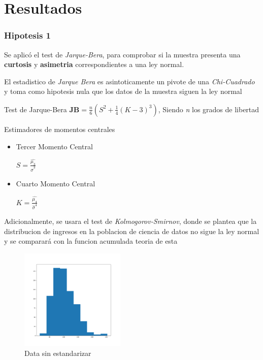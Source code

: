 \documentclass{beamer}
\begin{document}
\section{Resultados}
\begin{frame}
\frametitle{Hipotesis 1}
  Se aplicó el test de \textit{Jarque-Bera}, para comprobar si la muestra
  presenta una \textbf{curtosis} y \textbf{asimetria} correspondientes
  a una ley normal.

  El estadistico de \textit{Jarque Bera} es asintoticamente un pivote de
  una \textit{Chi-Cuadrado} y toma como hipotesis nula que los datos de la
  muestra siguen la ley normal

  \begin{alertblock}{Test de Jarque-Bera}
    $\textbf{JB} = \frac{n}{6}(S^2 +\frac{1}{4}(K - 3)^3)$, Siendo \textit{n} los grados de libertad
  \end{alertblock}

  \begin{block}{Estimadores de momentos centrales}
    \begin{itemize}
        \item Tercer Momento Central

          $S = \frac{\hat{\mu_3}}{\hat{\sigma}^3}$

        \item  Cuarto Momento Central

          $K = \frac{\hat{\mu_4}}{\hat{\sigma}^4}$

    \end{itemize}
  \end{block}

\end{frame}

\begin{frame}

  Adicionalmente, se usara el test de \textit{Kolmogorov-Smirnov}, donde se plantea
  que la distribucion de ingresos en la poblacion de ciencia de datos
  no sigue la ley normal y se comparará con la funcion acumulada teoria
  de esta
  \begin{figure}[t]
    \caption{Data sin estandarizar}
    \includegraphics[width=5cm]{Figure_1.png}
  \end{figure}

\end{frame}
\end{document}
